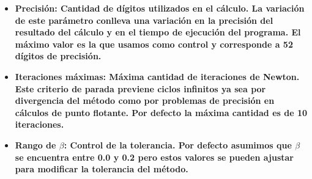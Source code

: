 \begin{itemize}

  \item \bf{Precisi\'on}: Cantidad de d\'igitos utilizados en el c\'alculo. La variaci\'on de este par\'ametro conlleva una variaci\'on en la precisi\'on del resultado del c\'alculo y en el tiempo de ejecuci\'on del programa. El m\'aximo valor es la que usamos como control y corresponde a 52 d\'igitos de precisi\'on.

  \item \bf{Iteraciones m\'aximas}: M\'axima cantidad de iteraciones de Newton. Este criterio de parada previene ciclos infinitos ya sea por divergencia del m\'etodo como por problemas de precisi\'on en c\'alculos de punto flotante. Por defecto la m\'axima cantidad es de 10 iteraciones.

  \item \bf{Rango de $\beta$}: Control de la tolerancia. Por defecto asumimos que $\beta$ se encuentra entre 0.0 y 0.2 pero estos valores se pueden ajustar para modificar la tolerancia del m\'etodo.

\end{itemize}

